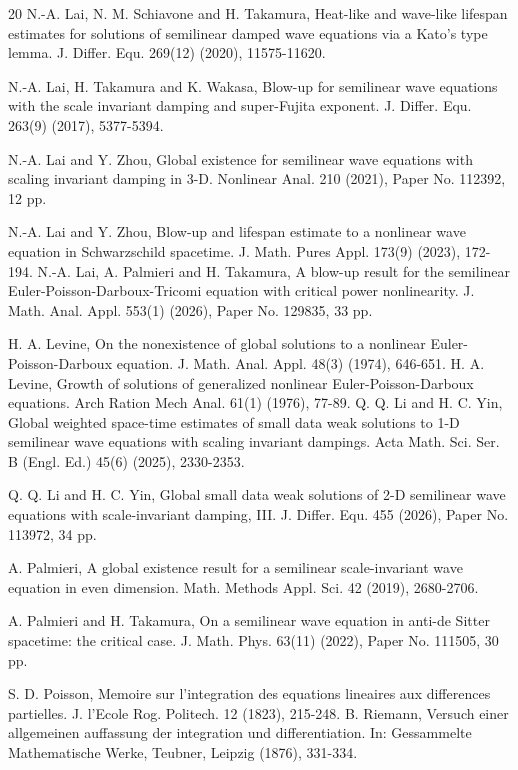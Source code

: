 \documentclass[review]{elsarticle}
\begin{document}
\begin{thebibliography}{20}
N.-A. Lai, N. M. Schiavone and H. Takamura, Heat-like and wave-like lifespan estimates for solutions of semilinear damped wave equations via a Kato's type lemma. J. Differ. Equ. 269(12) (2020), 11575-11620.

N.-A. Lai, H. Takamura and K. Wakasa, Blow-up for semilinear wave equations with the scale invariant damping and
super-Fujita exponent. J. Differ. Equ. 263(9) (2017), 5377-5394.

 N.-A. Lai and Y. Zhou, Global existence for semilinear wave equations with scaling invariant damping in 3-D. Nonlinear Anal. 210 (2021), Paper No. 112392, 12 pp.

N.-A. Lai and Y. Zhou, Blow-up and lifespan estimate to a nonlinear wave equation in Schwarzschild spacetime. J. Math. Pures Appl. 173(9) (2023), 172-194.
N.-A. Lai, A. Palmieri and H. Takamura,
A blow-up result for the semilinear Euler-Poisson-Darboux-Tricomi equation with critical power nonlinearity.  J. Math. Anal. Appl. 553(1) (2026),  Paper No. 129835, 33 pp.

H. A. Levine, On the nonexistence of global solutions to a nonlinear Euler-Poisson-Darboux equation. J. Math. Anal. Appl. 48(3) (1974), 646-651.
H. A. Levine, Growth of solutions of generalized nonlinear Euler-Poisson-Darboux equations. Arch Ration Mech Anal. 61(1) (1976), 77-89.
 Q. Q. Li and H. C. Yin, Global weighted space-time estimates of small data weak solutions to 1-D semilinear wave equations with scaling invariant dampings. Acta Math. Sci. Ser. B (Engl. Ed.) 45(6) (2025), 2330-2353.

 Q. Q. Li and H. C. Yin, Global small data weak solutions of 2-D semilinear wave equations with scale-invariant damping, III. J. Differ. Equ. 455 (2026), Paper No. 113972, 34 pp.


A. Palmieri, A global existence result for a semilinear scale-invariant wave equation in even dimension. Math.
Methods Appl. Sci. 42 (2019), 2680-2706.

 A. Palmieri and H. Takamura, On a semilinear wave equation in anti-de Sitter spacetime: the critical case. J. Math. Phys. 63(11) (2022), Paper No. 111505, 30 pp.



S. D. Poisson, Memoire sur l'integration des equations lineaires aux differences partielles. J. l'Ecole Rog. Politech. 12 (1823), 215-248.
B. Riemann, Versuch einer allgemeinen auffassung der integration und differentiation. In: Gessammelte Mathematische Werke, Teubner, Leipzig (1876), 331-334.


\end{thebibliography}
\end{document}
